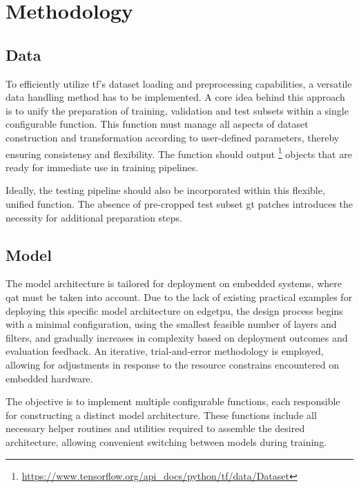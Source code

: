 {\section{Methodology}

\subsection*{Data}

To efficiently utilize \gls{tf}'s dataset loading and preprocessing capabilities, a versatile data handling method has to be implemented.
A core idea behind this approach is to unify the preparation of training, validation and test subsets within a single configurable function.
This function must manage all aspects of dataset construction and transformation according to user-defined parameters, thereby ensuring consistensy and flexibility.
The function should output \footnote{\url{https://www.tensorflow.org/api_docs/python/tf/data/Dataset}} objects that are ready for immediate use in training pipelines.

Ideally, the testing pipeline should also be incorporated within this flexible, unified function.
The absence of pre-cropped test subset \gls{gt} patches introduces the necessity for additional preparation steps.

\subsection*{Model}

The model architecture is tailored for deployment on embedded systems, where \gls{qat} must be taken into account.
Due to the lack of existing practical examples for deploying this specific model architecture on \gls{edgetpu},
the design process begins with a minimal configuration, using the smallest feasible number of layers and filters,
and gradually increases in complexity based on deployment outcomes and evaluation feedback.
An iterative, trial-and-error methodology is employed, allowing for adjustments in response to the resource constrains encountered on embedded hardware.

The objective is to implement multiple configurable functions, each responsible for constructing a distinct model architecture.
These functions include all necessary helper routines and utilities required to assemble the desired architecture,
allowing convenient switching between models during training.

}
